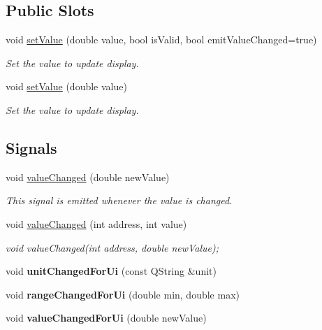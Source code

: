 \subsection*{Public Slots}
\begin{DoxyCompactItemize}
\item 
void \hyperlink{classmdt_analog_io_ac83abbda2bafce5c02e3ae1dbc5e2555}{setValue} (double value, bool isValid, bool emitValueChanged=true)
\begin{DoxyCompactList}\small\item\em Set the value to update display. \end{DoxyCompactList}\item 
void \hyperlink{classmdt_analog_io_a9729875cb13fa2069e40c9abce914870}{setValue} (double value)
\begin{DoxyCompactList}\small\item\em Set the value to update display. \end{DoxyCompactList}\end{DoxyCompactItemize}
\subsection*{Signals}
\begin{DoxyCompactItemize}
\item 
\hypertarget{classmdt_analog_io_ad658090469cc6b69fa92d9bca73d8a16}{
void \hyperlink{classmdt_analog_io_ad658090469cc6b69fa92d9bca73d8a16}{valueChanged} (double newValue)}
\label{classmdt_analog_io_ad658090469cc6b69fa92d9bca73d8a16}

\begin{DoxyCompactList}\small\item\em This signal is emitted whenever the value is changed. \end{DoxyCompactList}\item 
void \hyperlink{classmdt_analog_io_ac36d804e82a4ca9401687700e9e6a136}{valueChanged} (int address, int value)
\begin{DoxyCompactList}\small\item\em void valueChanged(int address, double newValue); \end{DoxyCompactList}\item 
\hypertarget{classmdt_analog_io_aa81b49605f601850ecfa780f2b758e98}{
void {\bfseries unitChangedForUi} (const QString \&unit)}
\label{classmdt_analog_io_aa81b49605f601850ecfa780f2b758e98}

\item 
\hypertarget{classmdt_analog_io_a40735cbbf852790067a6f9b57aac4aa3}{
void {\bfseries rangeChangedForUi} (double min, double max)}
\label{classmdt_analog_io_a40735cbbf852790067a6f9b57aac4aa3}

\item 
\hypertarget{classmdt_analog_io_aaef16a200f5a862356eaeb4a65a1e06f}{
void {\bfseries valueChangedForUi} (double newValue)}
\label{classmdt_analog_io_aaef16a200f5a862356eaeb4a65a1e06f}

\end{DoxyCompactItemize}
